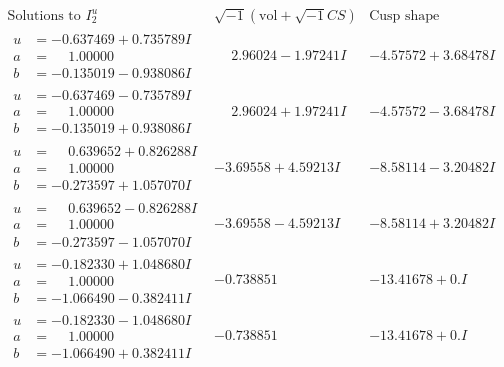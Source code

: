 \documentclass[1p]{elsarticle_modified}
\theoremstyle{definition}
\newcommand{\I}{\sqrt{-1}}
\begin{document}
$$\begin{array}{c|c|c}  
\text{Solutions to }I^u_{2}& \I (\text{vol} + \sqrt{-1}CS) & \text{Cusp shape}\\
 \hline 
\begin{aligned}
u &= -0.637469 + 0.735789 I \\
a &= \phantom{-}1.00000\phantom{ +0.000000I} \\
b &= -0.135019 - 0.938086 I\end{aligned}
 & \phantom{-}2.96024 - 1.97241 I & -4.57572 + 3.68478 I \\ \hline\begin{aligned}
u &= -0.637469 - 0.735789 I \\
a &= \phantom{-}1.00000\phantom{ +0.000000I} \\
b &= -0.135019 + 0.938086 I\end{aligned}
 & \phantom{-}2.96024 + 1.97241 I & -4.57572 - 3.68478 I \\ \hline\begin{aligned}
u &= \phantom{-}0.639652 + 0.826288 I \\
a &= \phantom{-}1.00000\phantom{ +0.000000I} \\
b &= -0.273597 + 1.057070 I\end{aligned}
 & -3.69558 + 4.59213 I & -8.58114 - 3.20482 I \\ \hline\begin{aligned}
u &= \phantom{-}0.639652 - 0.826288 I \\
a &= \phantom{-}1.00000\phantom{ +0.000000I} \\
b &= -0.273597 - 1.057070 I\end{aligned}
 & -3.69558 - 4.59213 I & -8.58114 + 3.20482 I \\ \hline\begin{aligned}
u &= -0.182330 + 1.048680 I \\
a &= \phantom{-}1.00000\phantom{ +0.000000I} \\
b &= -1.066490 - 0.382411 I\end{aligned}
 & -0.738851\phantom{ +0.000000I} & -13.41678 + 0. I\phantom{ +0.000000I} \\ \hline\begin{aligned}
u &= -0.182330 - 1.048680 I \\
a &= \phantom{-}1.00000\phantom{ +0.000000I} \\
b &= -1.066490 + 0.382411 I\end{aligned}
 & -0.738851\phantom{ +0.000000I} & -13.41678 + 0. I\phantom{ +0.000000I} \\ \hline\begin{aligned}

\end{aligned}
\end{array}$$
\end{document}
